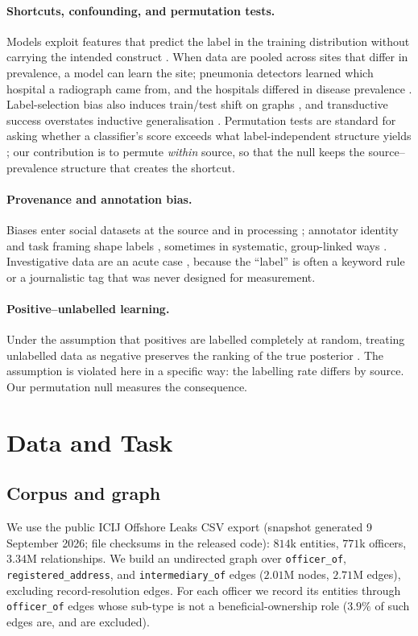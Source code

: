 \documentclass[11pt]{article}
\begin{document}
\paragraph{Shortcuts, confounding, and permutation tests.} Models exploit
features that predict the label in the training distribution without carrying
the intended construct \citep{geirhos2020shortcut}. When data are pooled across
sites that differ in prevalence, a model can learn the site; pneumonia detectors
learned which hospital a radiograph came from, and the hospitals differed in
disease prevalence \citep{zech2018variable}. Label-selection bias also induces
train/test shift on graphs \citep{shiftrobust}, and transductive success
overstates inductive generalisation \citep{graphuniverse}. Permutation tests are
standard for asking whether a classifier's score exceeds what label-independent
structure yields \citep{ojala2010permutation}; our contribution is to permute
\emph{within} source, so that the null keeps the source--prevalence structure that
creates the shortcut.
\paragraph{Provenance and annotation bias.} Biases enter social datasets at the
source and in processing \citep{olteanu2019social}; annotator identity and task
framing shape labels \citep{geva2019annotator}, sometimes in systematic,
group-linked ways \citep{sap2019racial}. Investigative data are an acute case
\citep{compjourn}, because the ``label'' is often a keyword rule or a journalistic
tag that was never designed for measurement.
\paragraph{Positive--unlabelled learning.} Under the assumption that positives are
labelled completely at random, treating unlabelled data as negative preserves the
ranking of the true posterior \citep{elkan}. The assumption is violated here in a
specific way: the labelling rate differs by source. Our permutation null measures
the consequence.

\section{Data and Task}\label{sec:data}
\subsection{Corpus and graph}
We use the public ICIJ Offshore Leaks CSV export (snapshot generated 9 September
2026; file checksums in the released code): $814$k entities, $771$k officers,
$3.34$M relationships. We build an undirected graph over \texttt{officer\_of},
\texttt{registered\_address}, and \texttt{intermediary\_of} edges ($2.01$M nodes,
$2.71$M edges), excluding record-resolution edges. For each officer we record its
entities through \texttt{officer\_of} edges whose sub-type is not a
beneficial-ownership role ($3.9\%$ of such edges are, and are excluded).
\end{document}

